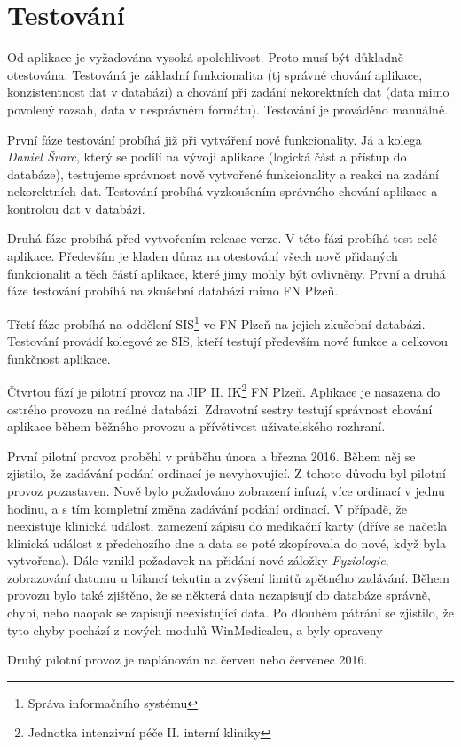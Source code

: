 \chapter{Testování}
\label{ch:test}

Od aplikace je vyžadována vysoká spolehlivost. Proto musí být důkladně otestována. Testováná je základní funkcionalita (tj správné chování aplikace, konzistentnost dat v databázi) a chování při zadání nekorektních dat (data mimo povolený rozsah, data v nesprávném formátu). Testování je prováděno manuálně.

První fáze testování probíhá již při vytváření nové funkcionality. Já a kolega \emph{Daniel Švarc}, který se podílí na vývoji aplikace (logická část a přístup do databáze), testujeme správnost nově vytvořené funkcionality a reakci na zadání nekorektních dat. Testování probíhá vyzkoušením správného chování aplikace a kontrolou dat v databázi.

Druhá fáze probíhá před vytvořením release verze. V této fázi probíhá test celé aplikace. Především je kladen důraz na otestování všech nově přidaných funkcionalit a těch částí aplikace, které jimy mohly být ovlivněny. První a druhá fáze testování probíhá na zkušební databázi mimo FN Plzeň.

Třetí fáze probíhá na oddělení SIS\footnote{Správa informačního systému} ve FN Plzeň na jejich zkušební databázi. Testování provádí kolegové ze SIS, kteří testují především nové funkce a celkovou funkčnost aplikace.

Čtvrtou fází je pilotní provoz na JIP II. IK\footnote{Jednotka intenzivní péče II. interní kliniky} FN Plzeň. Aplikace je nasazena do ostrého provozu na reálné databázi. Zdravotní sestry testují správnost chování aplikace během běžného provozu a přívětivost uživatelského rozhraní.

První pilotní provoz proběhl v průběhu února a března 2016. Během něj se zjistilo, že zadávání podání ordinací je nevyhovující. Z tohoto důvodu byl pilotní provoz pozastaven. Nově bylo požadováno zobrazení infuzí, více ordinací v jednu hodinu, a s tím kompletní změna zadávání podání ordinací. V případě, že neexistuje klinická událost, zamezení zápisu do medikační karty (dříve se načetla klinická událost z předchozího dne a data se poté zkopírovala do nové, když byla vytvořena).  Dále vznikl požadavek na přidání nové záložky \emph{Fyziologie}, zobrazování datumu u bilancí tekutin a zvýšení limitů zpětného zadávání. Během provozu bylo také zjištěno, že se některá data nezapisují do databáze správně, chybí, nebo naopak se zapisují neexistující data. Po dlouhém pátrání se zjistilo, že tyto chyby pochází z nových modulů WinMedicalcu, a byly opraveny

Druhý pilotní provoz je naplánován na červen nebo červenec 2016.